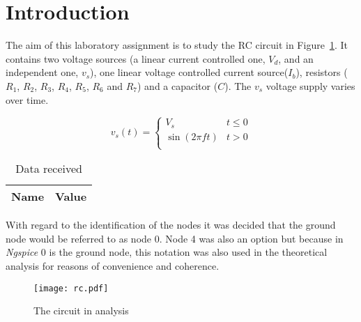 \section{Introduction}
\label{sec:introduction}


The aim of this laboratory assignment is to study the RC circuit in Figure~\ref{fig:rc}. It contains two voltage sources (a linear current controlled one, $V_d$, and an independent one, $v_s$), one linear voltage controlled  current source($I_b$), resistors ($R_1$, $R_2$, $R_3$, $R_4$, $R_5$, $R_6$ and $R_7$) and a capacitor ($C$).
The $v_s$ voltage supply varies over time.

\[ 
v_s (t)= \left\{
\begin{array}{ll}
      V_s & t \leq 0 \\
      \sin(2 \pi f t) & t>0\\
\end{array} 
\right. 
\]

\begin{table}[hbt!]
  \centering
  \begin{tabular}{|c|c|}
    \hline    
    {\bf Name} & {\bf Value} \\ \hline
    
  \end{tabular}
  \caption{Data received}
  \label{tab:data}
\end{table}



With regard to the identification of the nodes it was decided that the ground node would be referred to as node 0. Node 4 was also an option but because in \textit{Ngspice} 0 is the ground node, this notation was also used in the theoretical analysis for reasons of convenience and coherence.



\begin{figure}[h] \centering
\texttt{[image: rc.pdf]}
\caption{The circuit in analysis}
\label{fig:rc}
\end{figure}




%    



